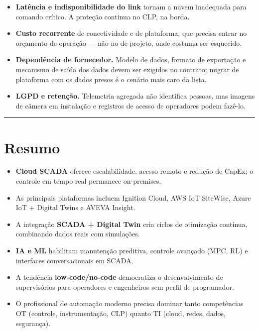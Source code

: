 \begin{itemize}
\tightlist
\item
  \textbf{Latência e indisponibilidade do link} tornam a nuvem inadequada para comando crítico. A
  proteção continua no CLP, na borda.
\item
  \textbf{Custo recorrente} de conectividade e de plataforma, que precisa entrar no orçamento de
  operação --- não no de projeto, onde costuma ser esquecido.
\item
  \textbf{Dependência de fornecedor.} Modelo de dados, formato de exportação e mecanismo de saída dos
  dados devem ser exigidos no contrato; migrar de plataforma com os dados presos é o cenário mais
  caro da lista.
\item
  \textbf{LGPD e retenção.} Telemetria agregada não identifica pessoas, mas imagens de câmera em
  instalação e registros de acesso de operadores podem fazê-lo.
\end{itemize}

\begin{center}\rule{0.5\linewidth}{0.5pt}\end{center}

\section{Resumo}\label{resumo}

\begin{itemize}
\tightlist
\item
  \textbf{Cloud SCADA} oferece escalabilidade, acesso remoto e redução de CapEx; o controle em tempo real permanece on-premises.
\item
  As principais plataformas incluem Ignition Cloud, AWS IoT SiteWise, Azure IoT + Digital Twins e AVEVA Insight.
\item
  A integração \textbf{SCADA + Digital Twin} cria ciclos de otimização contínua, combinando dados reais com simulações.
\item
  \textbf{IA e ML} habilitam manutenção preditiva, controle avançado (MPC, RL) e interfaces conversacionais em SCADA.
\item
  A tendência \textbf{low-code/no-code} democratiza o desenvolvimento de supervisórios para operadores e engenheiros sem perfil de programador.
\item
  O profissional de automação moderno precisa dominar tanto competências OT (controle, instrumentação, CLP) quanto TI (cloud, redes, dados, segurança).
\end{itemize}

